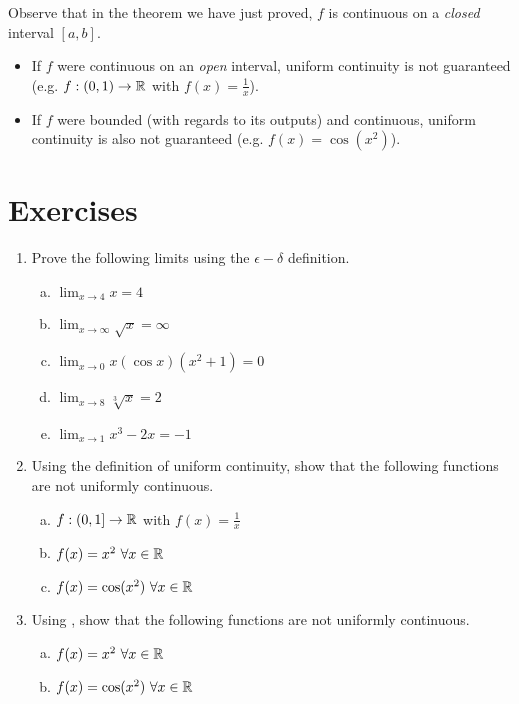 Observe that in the theorem we have just proved, $f$ is continuous on a \textit{closed} interval $[a, b]$.
\begin{itemize}
  \item If $f$ were continuous on an \textit{open} interval, uniform continuity is not guaranteed (e.g. $f: (0, 1) \to \mathbb{R}$ with $\displaystyle f(x) = \frac{1}{x}$).
  \item If $f$ were bounded (with regards to its outputs) and continuous, uniform continuity is also not guaranteed (e.g. $f(x) = \cos(x ^ 2)$).
\end{itemize} 


\section{Exercises}
\begin{enumerate}[1.]
  \item Prove the following limits using the $\epsilon - \delta$ definition.
    \begin{enumerate}[a.]
      \item $\displaystyle \lim_{x \to 4} x = 4$
      \item $\displaystyle \lim_{x \to \infty} \sqrt{x} = \infty$
      \item $\displaystyle \lim_{x \to 0} x(\cos x)(x ^ 2 + 1) = 0$
      \item $\displaystyle \lim_{x \to 8} \sqrt[3]{x} = 2$
      \item $\displaystyle \lim_{x \to 1} x ^ 3 - 2x = -1$
    \end{enumerate}
  \item Using the definition of uniform continuity, show that the following functions are not uniformly continuous.
    \begin{enumerate}[a.]
      \item $f: (0, 1] \to \mathbb{R}$ with $\displaystyle f(x) = \frac{1}{x}$
      \item $f(x) = x ^ 2 \ \forall x \in \mathbb{R}$
      \item $f(x) = \cos(x ^ 2) \ \forall x \in \mathbb{R}$
      \end{enumerate}
  \item Using , show that the following functions are not uniformly continuous.
    \begin{enumerate}[a.]
      \item $f(x) = x ^ 2 \ \forall x \in \mathbb{R}$
      \item $f(x) = \cos(x ^ 2) \ \forall x \in \mathbb{R}$ 
    \end{enumerate}
\end{enumerate}

